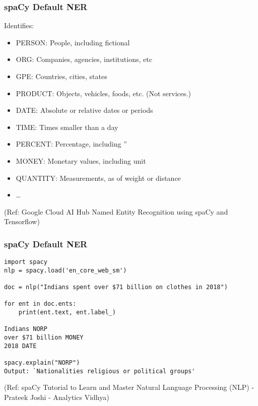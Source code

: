 \begin{frame}[fragile]\frametitle{spaCy Default NER}
Identifies:
  \begin{itemize}
  \item PERSON:	People, including fictional
	\item ORG:	Companies, agencies, institutions, etc
	\item GPE:	Countries, cities, states
	\item PRODUCT:	Objects, vehicles, foods, etc. (Not services.)
	\item DATE:	Absolute or relative dates or periods
	\item TIME:	Times smaller than a day
	\item PERCENT:	Percentage, including ”%
	\item MONEY:	Monetary values, including unit
	\item QUANTITY:	Measurements, as of weight or distance
	\item \ldots
  \end{itemize}
	
	{\tiny (Ref: Google Cloud AI Hub Named Entity Recognition using spaCy and Tensorflow)}
\end{frame}

\begin{frame}[fragile]\frametitle{spaCy Default NER}

\begin{lstlisting}
import spacy
nlp = spacy.load('en_core_web_sm')

doc = nlp("Indians spent over $71 billion on clothes in 2018")
 
for ent in doc.ents:
    print(ent.text, ent.label_)
		
Indians NORP
over $71 billion MONEY
2018 DATE

spacy.explain("NORP")
Output: `Nationalities religious or political groups'
\end{lstlisting}
	
	{\tiny (Ref: spaCy Tutorial to Learn and Master Natural Language Processing (NLP) - Prateek Joshi - Analytics Vidhya)}
\end{frame}


